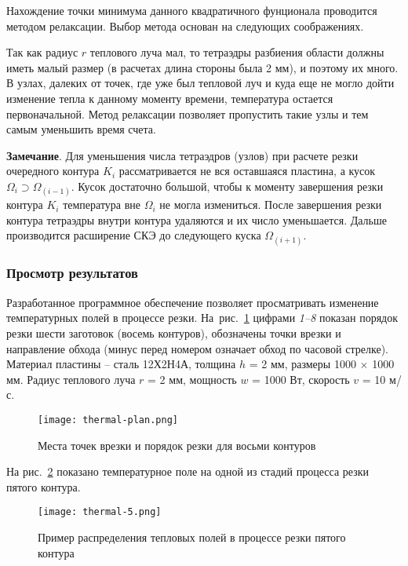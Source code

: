 Нахождение точки минимума данного квадратичного фунционала
проводится методом релаксации.
Выбор метода основан на следующих соображениях.

Так как радиус $r$
теплового луча мал,
то тетраэдры разбиения области должны иметь малый размер
(в расчетах длина стороны была 2 мм),
и поэтому их много.
В узлах, далеких от точек,
где уже был тепловой луч
и куда еще не могло дойти изменение тепла к данному моменту времени,
температура остается первоначальной.
Метод релаксации позволяет пропустить такие узлы
и тем самым уменьшить время счета.

{\bf Замечание}.
Для уменьшения числа тетраэдров (узлов)
при расчете резки очередного контура
$K_i$
рассматривается не вся оставшаяся пластина, а кусок
$\Omega_i \supset \Omega_{(i-1)}$.
Кусок  достаточно большой,
чтобы к моменту завершения резки контура
$K_i$
температура вне
$\Omega_i$
не могла измениться.
После завершения резки контура
тетраэдры внутри контура удаляются и их число уменьшается.
Дальше производится расширение СКЭ до следующего куска
$\Omega_{(i+1)}$.

\subsubsection*{
  Просмотр результатов
}

Разработанное программное обеспечение
позволяет просматривать изменение температурных полей
в процессе резки.
На~рис.~\ref{thermal-plan}
цифрами {\it 1--8}
показан порядок резки
шести заготовок (восемь контуров),
обозначены точки врезки и направление обхода
(минус перед номером означает обход по часовой стрелке).
Материал пластины -- сталь 12Х2Н4А,
толщина $h$ = 2 мм,
размеры 1000 $\times$ 1000 мм.
Радиус теплового луча $r$ = 2 мм,
мощность $w$ = 1000 Вт,
скорость $v$ = 10 м/с.

\begin{figure}[H]
  \centering
  \texttt{[image: thermal-plan.png]}
  \caption{
    Места точек врезки и порядок резки для восьми контуров
  }
  \label{thermal-plan}
\end{figure}

На рис.~\ref{thermal-5} показано температурное поле
на одной из стадий процесса резки пятого контура.

\begin{figure}[H]
  \centering
  \texttt{[image: thermal-5.png]}
  \caption{
      Пример распределения тепловых полей в процессе резки пятого контура
    }
  \label{thermal-5}
\end{figure}

